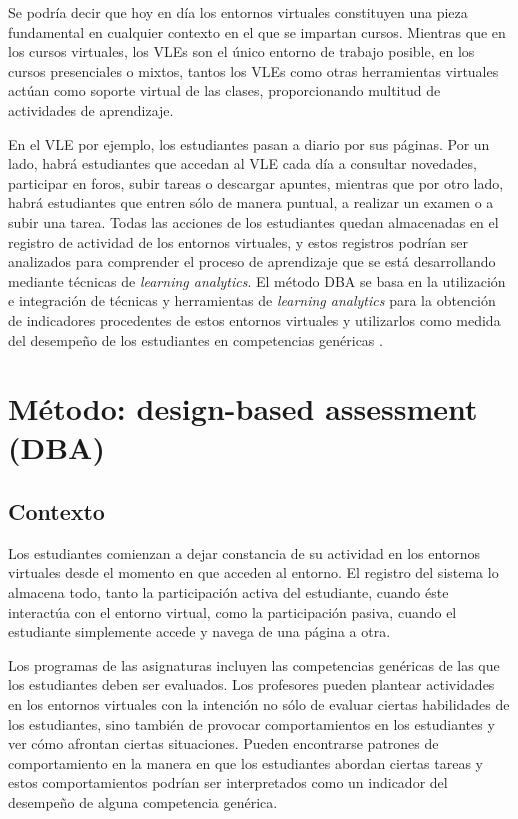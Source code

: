 Se podría decir que hoy en día los entornos virtuales constituyen una pieza fundamental en cualquier contexto en el que se impartan cursos. Mientras que en los cursos virtuales, los VLEs son el único entorno de trabajo posible, en los cursos presenciales o mixtos, tantos los VLEs como otras herramientas virtuales actúan como soporte virtual de las clases, proporcionando multitud de actividades de aprendizaje. 

En el VLE por ejemplo, los estudiantes pasan a diario por sus páginas. Por un lado, habrá estudiantes que accedan al VLE cada día a consultar novedades, participar en foros, subir tareas o descargar apuntes, mientras que por otro lado, habrá estudiantes que entren sólo de manera puntual, a realizar un examen o a subir una tarea. Todas las acciones de los estudiantes quedan almacenadas en el registro de actividad de los entornos virtuales, y estos registros podrían ser analizados para comprender el proceso de aprendizaje que se está desarrollando mediante técnicas de \emph{learning analytics}. El método DBA se basa en la utilización e integración de técnicas y herramientas de \emph{learning analytics} para la obtención de indicadores procedentes de estos entornos virtuales y utilizarlos como medida del desempeño de los estudiantes en competencias genéricas .


\section{Método: design-based assessment (DBA)}

\subsection{Contexto}

Los estudiantes comienzan a dejar constancia de su actividad en los entornos virtuales desde el momento en que acceden al entorno. El registro del sistema lo almacena todo, tanto la participación activa del estudiante, cuando éste interactúa con el entorno virtual, como la participación pasiva, cuando el estudiante simplemente accede y navega de una página a otra. 

Los programas de las asignaturas incluyen las competencias genéricas de las que los estudiantes deben ser evaluados. Los profesores pueden plantear actividades en los entornos virtuales con la intención no sólo de evaluar ciertas habilidades de los estudiantes, sino también de provocar comportamientos en los estudiantes y ver cómo afrontan ciertas situaciones. Pueden encontrarse patrones de comportamiento en la manera en que los estudiantes abordan ciertas tareas y estos comportamientos podrían ser interpretados como un indicador del desempeño de alguna competencia genérica.

